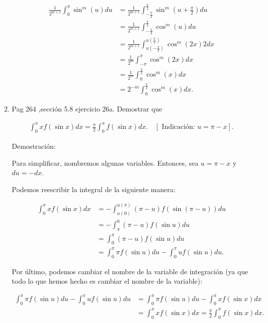 \documentclass{report}
\begin{document}
\begin{enumerate}
        \begin{align*}
        \frac{1}{2^{m+1}}\int_{0}^{\pi} \sin^m(u) du &= \frac{1}{2^{m+1}}\int_{-\frac{\pi}{2}}^{\frac{\pi}{2}} \sin^m\left(u+\frac{\pi}{2}\right) du\\
        &= \frac{1}{2^{m+1}}\int_{-\frac{\pi}{2}}^{\frac{\pi}{2}} \cos^m(u) du\\
        &= \frac{1}{2^{m+1}}\int_{u(-\frac{\pi}{2})}^{u(\frac{\pi}{2})} \cos^m(2x) 2dx\\
        &= \frac{1}{2^m} \int_{-\pi}^{\pi} \cos^m(2x) dx\\
        &= \frac{1}{2^m}\int_{0}^{\frac{\pi}{2}} \cos^m(x) dx\\
        &= 2^{-m} \int_{0}^{\frac{\pi}{2}} \cos^m(x) dx.
        \end{align*}
        
        \item Pag 264 ,sección 5.8 ejercicio 26a. Demostrar que
        
        \begin{align*}
        \int_{0}^{\pi} x f(\sin x) d x = \frac{\pi}{2} \int_{0}^{\pi} f(\sin x) d x. \quad[\text { Indicación: } u=\pi-x].
        \end{align*}
        
        Demostración: 
        
        Para simplificar, nombremos algunas variables. Entonces, sea $u = \pi - x$ y $du = -dx$. 
        
        Podemos reescribir la integral de la siguiente manera:
        
        \begin{align*}
        \int_{0}^{\pi} x f(\sin x) d x &= -\int_{u(0)}^{u(\pi)} (\pi - u) f(\sin(\pi - u)) d u \\
        &= -\int_{\pi}^{0} (\pi - u) f(\sin u) d u \\
        &= \int_{0}^{\pi} (\pi - u) f(\sin u) d u \\
        &= \int_{0}^{\pi} \pi f(\sin u) d u - \int_{0}^{\pi} u f(\sin u) d u. 
        \end{align*}
        
        Por último, podemos cambiar el nombre de la variable de integración (ya que todo lo que hemos hecho es cambiar el nombre de la variable):
        
        \begin{align*}
        \int_{0}^{\pi} \pi f(\sin u) d u - \int_{0}^{\pi} u f(\sin u) d u &= \int_{0}^{\pi} \pi f(\sin u) d u - \int_{0}^{\pi} x f(\sin x) d x \\
        &= \int_{0}^{\pi} x f(\sin x) d x = \frac{\pi}{2} \int_{0}^{\pi} f(\sin x) d x.
        \end{align*}
        

\end{enumerate}
\end{document}
